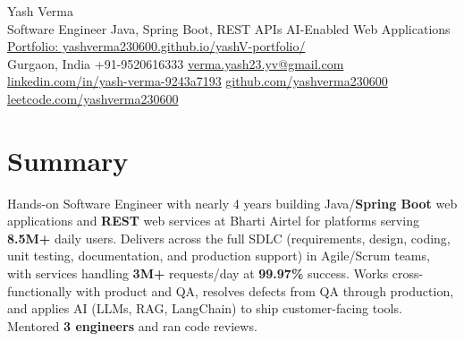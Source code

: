 \documentclass[letterpaper,11pt]{article}
\begin{document}
\begin{center}
  {\Huge Yash Verma} \\
  \small Software Engineer \textbar{} Java, Spring Boot, REST APIs \textbar{} AI-Enabled Web Applications \\
  \href{https://yashverma230600.github.io/yashV-portfolio/}{Portfolio: yashverma230600.github.io/yashV-portfolio/} \\
  \vspace{8pt}
  \small
  Gurgaon, India \textbar{}
  +91-9520616333 \textbar{}
  \href{mailto:verma.yash23.yv@gmail.com}{verma.yash23.yv@gmail.com} \textbar{}
  \href{https://www.linkedin.com/in/yash-verma-9243a7193/}{linkedin.com/in/yash-verma-9243a7193} \textbar{}
  \href{https://github.com/yashverma230600}{github.com/yashverma230600} \textbar{}
  \href{https://leetcode.com/yashverma230600}{leetcode.com/yashverma230600}
  \vspace{-8pt}
\end{center}

\section{Summary}
\begin{itemize}[leftmargin=0.15in, label={}]
  \small{\item{
    Hands-on Software Engineer with nearly 4 years building Java/\textbf{Spring Boot} web applications and \textbf{REST} web services at Bharti Airtel for platforms serving \textbf{8.5M+} daily users. Delivers across the full SDLC (requirements, design, coding, unit testing, documentation, and production support) in Agile/Scrum teams, with services handling \textbf{3M+} requests/day at \textbf{99.97\%} success. Works cross-functionally with product and QA, resolves defects from QA through production, and applies AI (LLMs, RAG, LangChain) to ship customer-facing tools. Mentored \textbf{3 engineers} and ran code reviews.
  }}
\end{itemize}
\vspace{-8pt}

\end{document}
